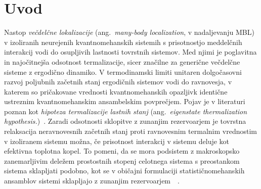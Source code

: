 \chapter{Uvod}
Nastop \emph{večdelčne lokalizacije} (ang.~\emph{many-body localization}, v nadaljevanju MBL) v izoliranih neurejenih kvantnomehanskih sistemih s prisotnostjo meddelčnih interakcij vodi do osupljivih lastnosti tovrstnih sistemov. Med njimi je poglavitna in najočitnejša odsotnost termalizacije, sicer značilne za generične večdelčne sisteme z ergodično dinamiko. V termodinamski limiti unitaren dolgočasovni razvoj poljubnih začetnih stanj ergodičnih sistemov vodi do ravnovesja, v katerem so pričakovane vrednosti kvantnomehanskih opazljivk identične ustreznim kvantnomehanskim ansambelskim povprečjem. Pojav je v literaturi poznan kot \emph{hipoteza termalizacije lastnih stanj} (ang.~\emph{eigenstate thermalization hypothesis.})~\cite{d2016quantum}. Zaradi odsotnosti sklopitve z zunanjim rezervoarjem je tovrstna relaksacija neravnovesnih začetnih stanj proti ravnovesnim termalnim vrednostim v izoliranem sistemu možna, če prisotnost interakcij v sistemu deluje kot efektivna toplotna kopel. To pomeni, da se mora podsistem z makroskopsko zanemarljivim deležem prostostnih stopenj  celotnega sistema s preostankom sistema sklapljati podobno, kot se v običajni formulaciji statističnomehanskih ansamblov sistemi sklapljajo z zunanjim rezervoarjem~\cite{abanin2018ergodicity}~\cite{nandkishore2015many}. \\\\
